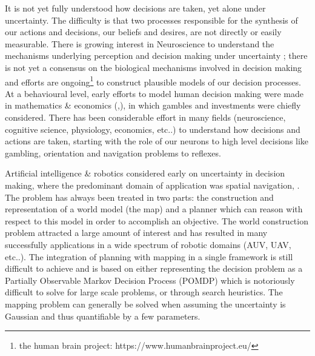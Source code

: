 It is not yet fully understood how decisions are taken, yet alone under uncertainty. The difficulty is that two processes responsible 
for the synthesis of our actions and decisions, our beliefs and desires, are not directly or easily measurable. There is growing interest in 
Neuroscience to understand the mechanisms underlying perception and decision making under uncertainty \cite{decision_un_2013}; there is not 
yet a consensus on the biological mechanisms involved in decision making and efforts are 
ongoing\footnote{the human brain project: https://www.humanbrainproject.eu/} to construct plausible models of our decision processes. 
At a behavioural level, early efforts to model human decision making were made in mathematics \& economics 
(\cite{Bernoulli1954},\cite{VonNeumann1944}), in which gambles and investments were chiefly considered. There has been 
considerable effort in many fields (neuroscience, cognitive science, physiology, economics, etc..) to understand how decisions and actions 
are taken, starting with the role of our neurons to high level decisions like gambling, orientation and navigation problems to reflexes. 
 


 

Artificial intelligence \& robotics considered early on uncertainty in decision making, 
where the predominant domain of application was spatial navigation, \cite{ActingUncertainty_1996}. The problem has 
always been treated in two parts: the construction and representation of a world model (the map) and a planner which can reason with 
respect to this model in order to accomplish an objective. The world construction problem attracted a large amount of 
interest and has resulted in many successfully applications in a wide spectrum of robotic domains (AUV, UAV, etc..). The integration of planning 
with mapping in a single framework is still difficult to achieve and is based on either representing the decision problem as a 
Partially Observable Markov Decision Process (POMDP) which is notoriously difficult to solve for large scale problems, or through search heuristics.  
The mapping problem can generally be solved when assuming the uncertainty is Gaussian and thus quantifiable 
by a few parameters.%

